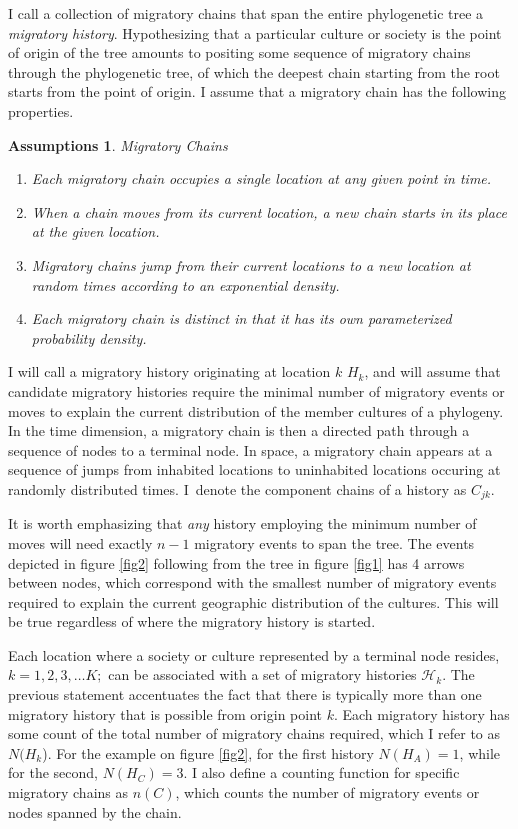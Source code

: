 \documentclass[11pt]{article}
\newtheorem{assumptions}{Assumptions}
\begin{document}
 I call a  collection of migratory chains that span the entire phylogenetic tree a \textit{migratory history}. Hypothesizing that a particular culture or society is the point of origin of the tree amounts to positing some sequence of migratory chains through the phylogenetic tree, of which the deepest chain starting from the root starts from the point of origin. I assume that a migratory chain has the following properties.

\begin{assumptions}{Migratory Chains}    
\begin{enumerate}
\item Each migratory chain occupies a single location at any given point in time.
\item When a chain moves from its current location, a new chain starts in its place at the given location.
\item Migratory chains jump from their current locations to a new location at random times according to an exponential density.
\item Each migratory chain is distinct in that it has its own parameterized probability density.
\end{enumerate}
\end{assumptions}
I will call a migratory history originating at location $k$ $H_k$, and will assume that candidate migratory histories require the minimal number of migratory events or moves to explain the current distribution of the member cultures of a phylogeny. In the time dimension, a migratory chain is then a directed path through a sequence of nodes to a terminal node. In space, a migratory chain appears at a sequence of jumps from inhabited locations to uninhabited locations occuring at randomly distributed times. I\ denote the component chains of a history as $C_{jk}$.

It is worth emphasizing that \textit{any} history employing the minimum number of moves will need exactly $n-1$ migratory events to span the tree. The events depicted in figure \ref{fig2} following from the tree in figure \ref{fig1} has 4 arrows between nodes, which correspond with the smallest number of migratory events required to explain the current geographic distribution of the cultures. This will be true regardless of where the migratory history is started. 

Each location where a society or culture represented by a terminal node resides,  $k=1,2,3,\hdots K;$ can be associated with a set of migratory histories $\mathcal{H}_k$. The previous statement accentuates the fact that there is typically more than one migratory history that is possible from origin point $k$. Each migratory history has some count of the total number of migratory chains required, which I refer to as  $N(H_k$). For the example on figure \ref{fig2}, for the first history $N(H_A)=1$, while for the second, $N(H_C)=3$.    I also define a counting function for specific migratory chains as $n(C)$, which counts the number of migratory events or nodes spanned by the chain. 
\end{document}
